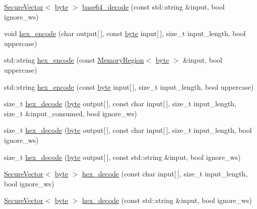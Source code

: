 \begin{DoxyCompactItemize}
\item 
\hyperlink{classBotan_1_1SecureVector}{Secure\-Vector}$<$ \hyperlink{namespaceBotan_a7d793989d801281df48c6b19616b8b84}{byte} $>$ \hyperlink{namespaceBotan_a118d32f6faec4d09544ef51d317820bb}{base64\-\_\-decode} (const std\-::string \&input, bool ignore\-\_\-ws)
\item 
void \hyperlink{namespaceBotan_a496f692e431459a812ba623cb3c8bd08}{hex\-\_\-encode} (char output\mbox{[}$\,$\mbox{]}, const \hyperlink{namespaceBotan_a7d793989d801281df48c6b19616b8b84}{byte} input\mbox{[}$\,$\mbox{]}, size\-\_\-t input\-\_\-length, bool uppercase)
\item 
std\-::string \hyperlink{namespaceBotan_a5a8a8154c97cfc16c62a450214868a57}{hex\-\_\-encode} (const \hyperlink{classBotan_1_1MemoryRegion}{Memory\-Region}$<$ \hyperlink{namespaceBotan_a7d793989d801281df48c6b19616b8b84}{byte} $>$ \&input, bool uppercase)
\item 
std\-::string \hyperlink{namespaceBotan_a3d1b2847530ce4e8966e39cbbaa36a27}{hex\-\_\-encode} (const \hyperlink{namespaceBotan_a7d793989d801281df48c6b19616b8b84}{byte} input\mbox{[}$\,$\mbox{]}, size\-\_\-t input\-\_\-length, bool uppercase)
\item 
size\-\_\-t \hyperlink{namespaceBotan_a0f62d01364eb30bcd9f7582334cfb939}{hex\-\_\-decode} (\hyperlink{namespaceBotan_a7d793989d801281df48c6b19616b8b84}{byte} output\mbox{[}$\,$\mbox{]}, const char input\mbox{[}$\,$\mbox{]}, size\-\_\-t input\-\_\-length, size\-\_\-t \&input\-\_\-consumed, bool ignore\-\_\-ws)
\item 
size\-\_\-t \hyperlink{namespaceBotan_ac034ea69e118572fc0f7b16e97b5ef81}{hex\-\_\-decode} (\hyperlink{namespaceBotan_a7d793989d801281df48c6b19616b8b84}{byte} output\mbox{[}$\,$\mbox{]}, const char input\mbox{[}$\,$\mbox{]}, size\-\_\-t input\-\_\-length, bool ignore\-\_\-ws)
\item 
size\-\_\-t \hyperlink{namespaceBotan_a20373e19e7433a78d2a050b1d52e7c4e}{hex\-\_\-decode} (\hyperlink{namespaceBotan_a7d793989d801281df48c6b19616b8b84}{byte} output\mbox{[}$\,$\mbox{]}, const std\-::string \&input, bool ignore\-\_\-ws)
\item 
\hyperlink{classBotan_1_1SecureVector}{Secure\-Vector}$<$ \hyperlink{namespaceBotan_a7d793989d801281df48c6b19616b8b84}{byte} $>$ \hyperlink{namespaceBotan_a423a96de2be66273feda9bbdbb58bd40}{hex\-\_\-decode} (const char input\mbox{[}$\,$\mbox{]}, size\-\_\-t input\-\_\-length, bool ignore\-\_\-ws)
\item 
\hyperlink{classBotan_1_1SecureVector}{Secure\-Vector}$<$ \hyperlink{namespaceBotan_a7d793989d801281df48c6b19616b8b84}{byte} $>$ \hyperlink{namespaceBotan_ae95303d94f7e6000f2142364646131c6}{hex\-\_\-decode} (const std\-::string \&input, bool ignore\-\_\-ws)

\end{DoxyCompactItemize}
